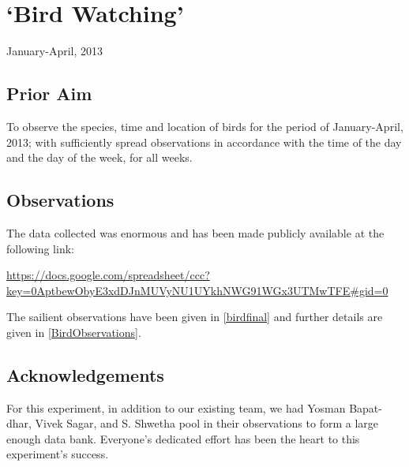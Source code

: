 \chapter{`Bird Watching'}
\begin{flushright}
January-April, 2013
\end{flushright}
\section{Prior Aim}
	To observe the species, time and location of birds for the period of January-April, 2013; with sufficiently spread observations in accordance with the time of the day and the day of the week, for all weeks.

\section{Observations}
	The data collected was enormous and has been made publicly available at the following link:
	\par
	\small{\url{https://docs.google.com/spreadsheet/ccc?key=0AptbewObyE3xdDJnMUVyNU1UYkhNWG91WGx3UTMwTFE#gid=0}}
	\par
	The sailient observations have been given in \autoref{birdfinal} and further details are given in \autoref{BirdObservations}.

	

\section{Acknowledgements}
	For this experiment, in addition to our existing team, we had Yosman Bapat-dhar, Vivek Sagar, and S. Shwetha pool in their observations to form a large enough data bank. Everyone's dedicated effort has been the heart to this experiment's success.